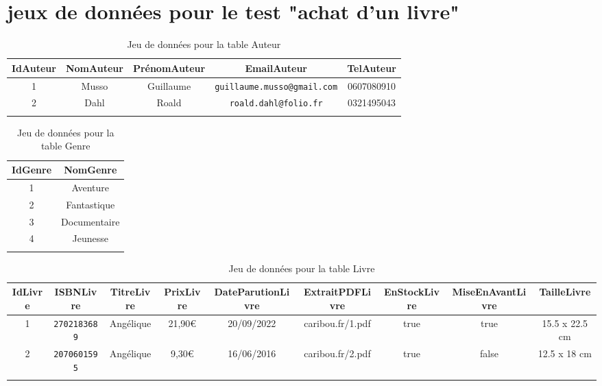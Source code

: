\documentclass[a4paper, 13pt]{article}
\begin{document}
\section{jeux de données pour le test "achat d'un livre"}
\begin{center}
    \begin{longtable}{|c|c|c|c|c|}
        \hline
        \textbf{IdAuteur} & \textbf{NomAuteur} & \textbf{PrénomAuteur} & \textbf{EmailAuteur} & \textbf{TelAuteur} \\
        \hline
        \hline
        1 & Musso & Guillaume & \texttt{guillaume.musso@gmail.com} & 0607080910 \\
        2 & Dahl & Roald & \texttt{roald.dahl@folio.fr} & 0321495043 \\
        \hline
        \caption{Jeu de données pour la table Auteur}
    \end{longtable}
\end{center}
\begin{center}
    \begin{longtable}{|c|c|}
        \hline
        \textbf{IdGenre} & \textbf{NomGenre} \\
        \hline
        \hline
        1 & Aventure \\
        2 & Fantastique \\
        3 & Documentaire \\
        4 & Jeunesse \\
        \hline
        \caption{Jeu de données pour la table Genre}
    \end{longtable}
\end{center}
\begin{center}
    \footnotesize
    \begin{longtable}{|c|c|c|c|c|c|c|c|c|}
        \hline
        \textbf{IdLivre} & \textbf{ISBNLivre} & \textbf{TitreLivre} & \textbf{PrixLivre} & \textbf{DateParutionLivre} & \textbf{ExtraitPDFLivre} & \textbf{EnStockLivre} & \textbf{MiseEnAvantLivre} & \textbf{TailleLivre} \\
        \hline
        \hline
        1 & \texttt{2702183689} & Angélique & 21,90€ & 20/09/2022 & caribou.fr/1.pdf & true & true & 15.5 x 22.5 cm \\
        2 & \texttt{2070601595} & Angélique & 9,30€ & 16/06/2016 & caribou.fr/2.pdf & true & false & 12.5 x 18 cm \\
        \hline
        \caption{Jeu de données pour la table Livre}
    \end{longtable}
\end{center}
\end{document}
